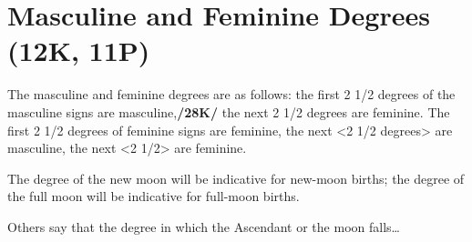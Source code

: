 \section{Masculine and Feminine Degrees (12K, 11P)}

The masculine and feminine degrees are as follows: the first 2 1/2 degrees of the masculine signs are masculine,\textbf{/28K/} the next 2 1/2 degrees are feminine. The first 2 1/2 degrees of feminine signs are feminine, the next <2 1/2 degrees> are masculine, the next <2 1/2> are feminine. 

\mndl[0.2cm]
The degree of the new moon will be indicative for new-moon births; the degree of the full moon will be indicative for full-moon births. 

Others say that the degree in which the Ascendant or the moon falls\ldots

\newpage